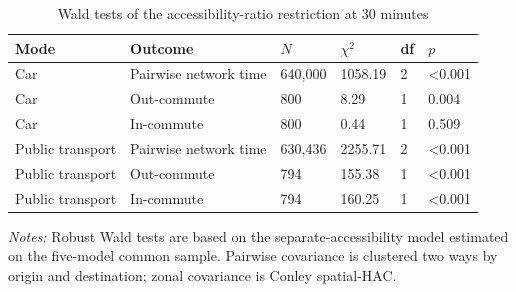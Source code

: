 \begin{table}[htbp]
\centering
\scriptsize
\caption{Wald tests of the accessibility-ratio restriction at 30 minutes}
\label{tab:ratiorestriction}
\begin{tabular}{llllll}
\toprule
Mode & Outcome & $N$ & $\chi^2$ & df & $p$ \\
\midrule
Car & Pairwise network time & 640,000 & 1058.19 & 2 & <0.001 \\
Car & Out-commute & 800 & 8.29 & 1 & 0.004 \\
Car & In-commute & 800 & 0.44 & 1 & 0.509 \\
Public transport & Pairwise network time & 630,436 & 2255.71 & 2 & <0.001 \\
Public transport & Out-commute & 794 & 155.38 & 1 & <0.001 \\
Public transport & In-commute & 794 & 160.25 & 1 & <0.001 \\
\bottomrule
\end{tabular}
\par\vspace{2pt}
\begin{minipage}{0.96\linewidth}\footnotesize\textit{Notes:} Robust Wald tests are based on the separate-accessibility model estimated on the five-model common sample. Pairwise covariance is clustered two ways by origin and destination; zonal covariance is Conley spatial-HAC.
\end{minipage}
\end{table}
